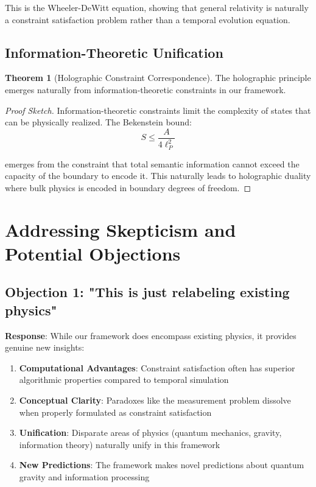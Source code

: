 \documentclass[11pt]{article}
\theoremstyle{definition}
\newtheorem{theorem}{Theorem}[section]
\begin{document}
This is the Wheeler-DeWitt equation, showing that general relativity is naturally a constraint satisfaction problem rather than a temporal evolution equation.

\subsection{Information-Theoretic Unification}

\begin{theorem}[Holographic Constraint Correspondence]
The holographic principle emerges naturally from information-theoretic constraints in our framework.
\end{theorem}

\begin{proof}[Proof Sketch]
Information-theoretic constraints limit the complexity of states that can be physically realized. The Bekenstein bound:
\begin{equation}
S \leq \frac{A}{4\ell_P^2}
\end{equation}

emerges from the constraint that total semantic information cannot exceed the capacity of the boundary to encode it. This naturally leads to holographic duality where bulk physics is encoded in boundary degrees of freedom.
\end{proof}

\section{Addressing Skepticism and Potential Objections}

\subsection{Objection 1: "This is just relabeling existing physics"}

\textbf{Response}: While our framework does encompass existing physics, it provides genuine new insights:

\begin{enumerate}
\item \textbf{Computational Advantages}: Constraint satisfaction often has superior algorithmic properties compared to temporal simulation
\item \textbf{Conceptual Clarity}: Paradoxes like the measurement problem dissolve when properly formulated as constraint satisfaction
\item \textbf{Unification}: Disparate areas of physics (quantum mechanics, gravity, information theory) naturally unify in this framework
\item \textbf{New Predictions}: The framework makes novel predictions about quantum gravity and information processing
\end{enumerate}
\end{document}
